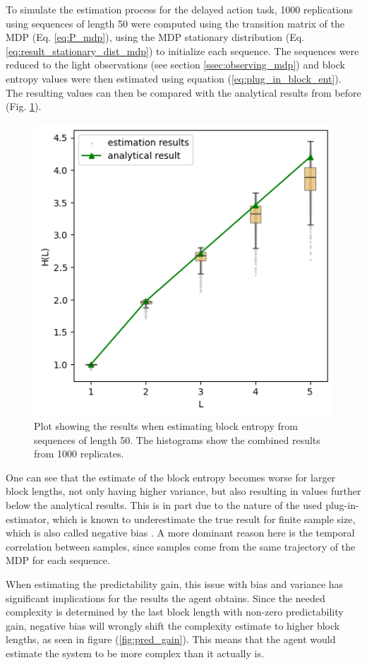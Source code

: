 \documentclass[12pt,a4paper]{article}
\begin{document}
To simulate the estimation process for the delayed action task, 1000 replications using sequences of length 50 were computed using the transition matrix of the MDP (Eq. \ref{eq:P_mdp}), using the MDP stationary distribution (Eq. \ref{eq:result_stationary_dist_mdp}) to initialize each sequence.
The sequences were reduced to the light observations (see section \ref{ssec:observing_mdp}) and block entropy values were then estimated using equation (\ref{eq:plug_in_block_ent}).
The resulting values can then be compared with the analytical results from before (Fig. \ref{fig:entropy_est}).

\begin{figure}[H]
    \centering
    \includegraphics[width=0.6\linewidth]{../figures/block_entropy_estimation_thesis.png}
    \caption{\label{fig:entropy_est} Plot showing the results when estimating block entropy from sequences of length 50. The histograms show the combined results from 1000 replicates.}
\end{figure}

One can see that the estimate of the block entropy becomes worse for larger block lengths, not only having higher variance, but also resulting in values further below the analytical results.
This is in part due to the nature of the used plug-in-estimator, which is known to underestimate the true result for finite sample size, which is also called negative bias \autocite{basharin1959plugin}.
A more dominant reason here is the temporal correlation between samples, since samples come from the same trajectory of the MDP for each sequence.

When estimating the predictability gain, this issue with bias and variance has significant implications for the results the agent obtains.
Since the needed complexity is determined by the last block length with non-zero predictability gain, negative bias will wrongly shift the complexity estimate to higher block lengths, as seen in figure (\ref{fig:pred_gain}).
This means that the agent would estimate the system to be more complex than it actually is.
\end{document}
